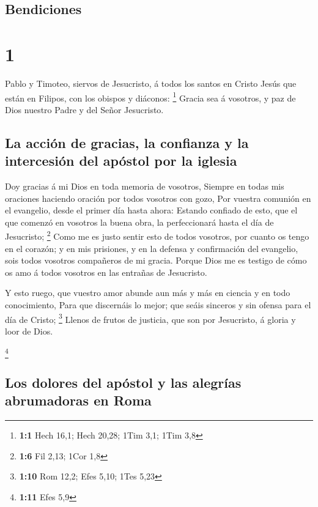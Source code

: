 \hypertarget{bendiciones}{%
\subsection{Bendiciones}\label{bendiciones}}

\hypertarget{section}{%
\section{1}\label{section}}

 Pablo y Timoteo, siervos de Jesucristo, á todos los santos
en Cristo Jesús que están en Filipos, con los obispos y diáconos:
\footnote{\textbf{1:1} Hech 16,1; Hech 20,28; 1Tim 3,1; 1Tim 3,8}
 Gracia sea á vosotros, y paz de Dios nuestro Padre y del
Señor Jesucristo.

\hypertarget{la-acciuxf3n-de-gracias-la-confianza-y-la-intercesiuxf3n-del-apuxf3stol-por-la-iglesia}{%
\subsection{La acción de gracias, la confianza y la intercesión del
apóstol por la
iglesia}\label{la-acciuxf3n-de-gracias-la-confianza-y-la-intercesiuxf3n-del-apuxf3stol-por-la-iglesia}}

 Doy gracias á mi Dios en toda memoria de vosotros,
 Siempre en todas mis oraciones haciendo oración por todos
vosotros con gozo,  Por vuestra comunión en el evangelio,
desde el primer día hasta ahora:  Estando confiado de esto,
que el que comenzó en vosotros la buena obra, la perfeccionará hasta el
día de Jesucristo; \footnote{\textbf{1:6} Fil 2,13; 1Cor 1,8}
 Como me es justo sentir esto de todos vosotros, por cuanto
os tengo en el corazón; y en mis prisiones, y en la defensa y
confirmación del evangelio, sois todos vosotros compañeros de mi gracia.
 Porque Dios me es testigo de cómo os amo á todos vosotros
en las entrañas de Jesucristo.

 Y esto ruego, que vuestro amor abunde aun más y más en
ciencia y en todo conocimiento,  Para que discernáis lo
mejor; que seáis sinceros y sin ofensa para el día de Cristo;
\footnote{\textbf{1:10} Rom 12,2; Efes 5,10; 1Tes 5,23} 
Llenos de frutos de justicia, que son por Jesucristo, á gloria y loor de
Dios.

\footnote{\textbf{1:11} Efes 5,9}

\hypertarget{los-dolores-del-apuxf3stol-y-las-alegruxedas-abrumadoras-en-roma}{%
\subsection{Los dolores del apóstol y las alegrías abrumadoras en
Roma}\label{los-dolores-del-apuxf3stol-y-las-alegruxedas-abrumadoras-en-roma}}

